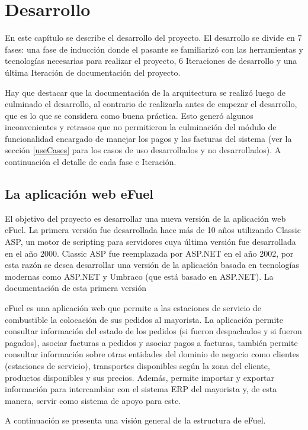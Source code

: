 \chapter{Desarrollo} \label{development}
En este capítulo se describe el desarrollo del proyecto. El desarrollo se divide en 7 fases: una fase de inducción donde el pasante se familiarizó con las herramientas y tecnologías necesarias para realizar el proyecto, 6 Iteraciones de desarrollo y una última Iteración de documentación del proyecto.

Hay que destacar que la documentación de la arquitectura se realizó luego de culminado el desarrollo, al contrario de realizarla antes de empezar el desarrollo, que es lo que se considera como buena práctica. Esto generó algunos inconvenientes y retrasos que no permitieron la culminación del módulo de funcionalidad encargado de manejar los pagos y las facturas del sistema (ver la sección \ref{useCases} para los casos de uso desarrollados y no desarrollados). A continuación el detalle de cada fase e Iteración.

\section{La aplicación web eFuel}
El objetivo del proyecto es desarrollar una nueva versión de la aplicación web eFuel. La primera versión fue desarrollada hace más de 10 años utilizando Classic ASP, un motor de scripting para servidores cuya última versión fue desarrollada en el año 2000. Classic ASP fue reemplazada por ASP.NET en el año 2002, por esta razón se desea desarrollar una versión de la aplicación basada en tecnologías modernas como ASP.NET y Umbraco (que está basado en ASP.NET). La documentación de esta primera versión

eFuel es una aplicación web que permite a las estaciones de servicio de combustible la colocación de sus pedidos al mayorista. La aplicación permite consultar información del estado de los pedidos (si fueron despachados y si fueron pagados), asociar facturas a pedidos y asociar pagos a facturas, también permite consultar información sobre otras entidades del dominio de negocio como clientes (estaciones de servicio), transportes disponibles según la zona del cliente, productos disponibles y sus precios. Además, permite importar y exportar información para intercambiar con el sistema ERP del mayorista y, de esta manera, servir como sistema de apoyo para este.

A continuación se presenta una visión general de la estructura de eFuel.

